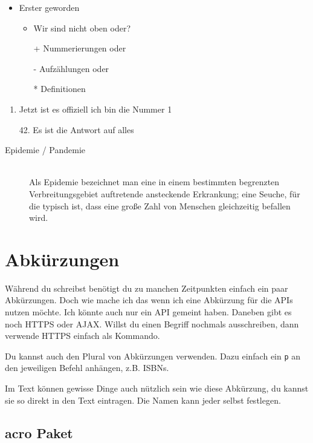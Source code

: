 \begin{itemize}
	\item Erster geworden
	\begin{itemize}
		\item Wir sind nicht oben oder?
		\item[+] Nummerierungen oder
		\item[-] Aufzählungen oder
		\item[*] Definitionen 
	\end{itemize}
\end{itemize}

\begin{enumerate}
	\item Jetzt ist es offiziell ich bin die Nummer 1
	\item[42.] Es ist die Antwort auf alles
\end{enumerate}

\begin{description}
	\item[Epidemie / Pandemie] \hfill \\
	Als Epidemie bezeichnet man eine in einem bestimmten begrenzten Verbreitungsgebiet auftretende ansteckende Erkrankung; eine Seuche, für die typisch ist, dass eine große Zahl von Menschen gleichzeitig befallen wird.
\end{description}


\section{Abkürzungen}
Während du schreibst benötigt du zu manchen Zeitpunkten einfach ein paar Abkürzungen. Doch wie mache ich das wenn ich eine Abkürzung für die \acp{API} nutzen möchte. Ich könnte auch nur ein \ac{API} gemeint haben. Daneben gibt es noch \ac{HTTPS} oder \ac{AJAX}. Willst du einen Begriff nochmals ausschreiben, dann verwende \acf{HTTPS} einfach als Kommando.

Du kannst auch den Plural von Abkürzungen verwenden. Dazu einfach ein \texttt{p} an den jeweiligen Befehl anhängen, z.B. 
\acfp{ISBN}.

Im Text können gewisse Dinge auch nützlich sein wie \zB diese Abkürzung, \dash du kannst sie so direkt in den Text eintragen. Die Namen kann jeder selbst festlegen.

\subsection{acro Paket}

